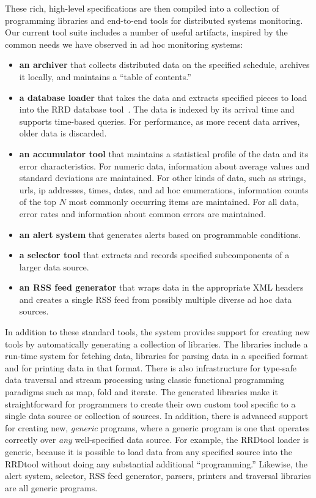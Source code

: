 These rich, high-level specifications are then compiled into a
collection of programming libraries and end-to-end tools for
distributed systems monitoring.  Our current tool suite includes a
number of useful artifacts, inspired by the common needs we have
observed in ad hoc monitoring systems:

\begin{itemize}
\item {\bf an archiver} that collects distributed data on the specified 
schedule, archives it locally, and maintains a ``table of contents.''
\item {\bf a database loader} that takes the data and extracts specified 
pieces to load into the RRD database tool~\cite{rrdtool}.  The data is 
indexed by its arrival time and supports time-based queries.  For 
performance, as more recent data arrives, older data is discarded.
\item {\bf an accumulator tool} that maintains a statistical profile of the 
data and its error characteristics.  For numeric data, information about 
average values and standard deviations are maintained.  For other kinds 
of data, such as strings, urls, ip addresses, times, dates, and ad hoc 
enumerations, information counts of the top $N$ most commonly occurring 
items are maintained.  For all data, error rates and information about 
common errors are maintained.
\item {\bf an alert system} that generates alerts based on programmable 
conditions.
\item {\bf a selector tool} that extracts and records specified 
subcomponents of a larger data source.
\item {\bf an RSS feed generator} that wraps data in the appropriate 
XML headers and creates a single RSS feed from possibly multiple diverse 
ad hoc data sources.
\end{itemize}

In addition to these standard tools, the system provides support for
creating new tools by automatically generating a collection of
libraries.  The libraries include a run-time system for fetching data,
libraries for parsing data in a specified format and for printing data
in that format.  There is also infrastructure for type-safe data
traversal and stream processing using classic functional programming
paradigms such as map, fold and iterate.  The generated libraries make
it straightforward for programmers to create their own custom tool
specific to a single data source or collection of sources.  In
addition, there is advanced support for creating new, {\em generic}
programs, where a generic program is one that operates correctly over
{\em any} well-specified data source.  For example, the RRDtool loader
is generic, because it is possible to load data from any specified
source into the RRDtool without doing any substantial additional
``programming.''  Likewise, the alert system, selector, RSS feed
generator, parsers, printers and traversal libraries are all generic
programs.

